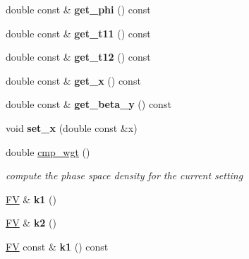 \begin{DoxyCompactItemize}
\item 
\hypertarget{classPS__2__2_a28bf4d69f8fcb2b359f521289a6a70d1}{double const \& {\bfseries get\-\_\-phi} () const }\label{classPS__2__2_a28bf4d69f8fcb2b359f521289a6a70d1}

\item 
\hypertarget{classPS__2__2_ae717002f8f6d84446f4353aa3cc97757}{double const \& {\bfseries get\-\_\-t11} () const }\label{classPS__2__2_ae717002f8f6d84446f4353aa3cc97757}

\item 
\hypertarget{classPS__2__2_a9e2bc01c150ce569013cebf16ca34528}{double const \& {\bfseries get\-\_\-t12} () const }\label{classPS__2__2_a9e2bc01c150ce569013cebf16ca34528}

\item 
\hypertarget{classPS__2__2_a3b1392c5e6a6e894b87926611333e782}{double const \& {\bfseries get\-\_\-x} () const }\label{classPS__2__2_a3b1392c5e6a6e894b87926611333e782}

\item 
\hypertarget{classPS__2__2_a7c253fa9526fb882c0fb386700f0a084}{double const \& {\bfseries get\-\_\-beta\-\_\-y} () const }\label{classPS__2__2_a7c253fa9526fb882c0fb386700f0a084}

\item 
\hypertarget{classPS__2__2_ab38bb5b8ac36bea7b044a72d0c9cfdbb}{void {\bfseries set\-\_\-x} (double const \&x)}\label{classPS__2__2_ab38bb5b8ac36bea7b044a72d0c9cfdbb}

\item 
\hypertarget{classPS__2__2_ad816da6fba743fbe6d7e67e119ad1cca}{double \hyperlink{classPS__2__2_ad816da6fba743fbe6d7e67e119ad1cca}{cmp\-\_\-wgt} ()}\label{classPS__2__2_ad816da6fba743fbe6d7e67e119ad1cca}

\begin{DoxyCompactList}\small\item\em compute the phase space density for the current setting \end{DoxyCompactList}\item 
\hypertarget{classPS__2__2_a11a23bbf3ce1288121b6f798012039ea}{\hyperlink{classFV}{F\-V} \& {\bfseries k1} ()}\label{classPS__2__2_a11a23bbf3ce1288121b6f798012039ea}

\item 
\hypertarget{classPS__2__2_ae80de8ff0390f3a92cf8cb55bafcfa39}{\hyperlink{classFV}{F\-V} \& {\bfseries k2} ()}\label{classPS__2__2_ae80de8ff0390f3a92cf8cb55bafcfa39}

\item 
\hypertarget{classPS__2__2_a50a2e1f1876ab83fbee307434053f9f5}{\hyperlink{classFV}{F\-V} const \& {\bfseries k1} () const }\label{classPS__2__2_a50a2e1f1876ab83fbee307434053f9f5}


\end{DoxyCompactItemize}

